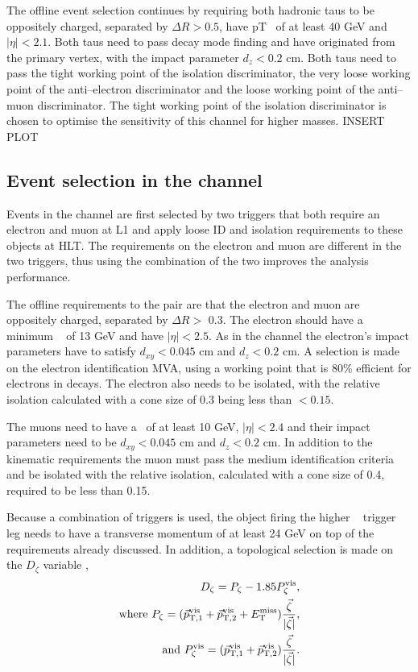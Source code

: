 The offline event selection continues by requiring both hadronic taus to be oppositely charged, separated
by $\Delta R > 0.5$, have pT~ of at least 40 GeV and $|\eta|<2.1$. Both taus need
to pass decay mode finding and have originated from the primary vertex, with the impact parameter $d_{z} < 0.2$ cm. 
Both taus need to pass the tight working point of the isolation discriminator, the very loose 
working point of the anti--electron discriminator and the loose working point of the anti--muon discriminator. 
The tight working point of the isolation discriminator is chosen to optimise the sensitivity
of this channel for higher masses. INSERT PLOT

\subsection{\texorpdfstring{Event selection in the \emu channel}{Event selection in the e mu channel}}
\label{sec:mssm_eventsel_em}
Events in the \emu channel are first selected by two triggers
that both require an electron and muon at \ac{L1} and apply loose ID and
isolation requirements to these objects at \ac{HLT}. The \pT requirements on
the electron and muon are different in the two triggers, thus using the combination of the two
improves the analysis performance.

The offline requirements to the \emu pair are that the electron 
and muon are oppositely charged, separated by $\Delta R >$ 0.3. The 
electron should have a minimum \pT~ of 13 GeV and have $|\eta|< 2.5$. As
in the \etau channel the electron's impact parameters have to 
satisfy $d_{xy} < 0.045$ cm and $d_{z}<0.2$ cm. A selection is
made on the electron identification MVA, using a working point that 
is 80\% efficient for electrons in \Zee decays. The electron
also needs to be isolated, with the relative isolation calculated
with a cone size of 0.3 being less than $<0.15$.

The muons need to have a \pT~of at least 10 GeV, $|\eta|<2.4$ and 
their impact parameters need to be $d_{xy}<0.045$ cm and $d_{z}<0.2$ cm.
In addition to the kinematic requirements the muon must
pass the medium identification criteria and be isolated with the relative
isolation, calculated with a cone size of 0.4, required to be less than 0.15.

Because a combination of triggers is used, the object firing
the higher \pT~ trigger leg needs to have a transverse momentum
of at least 24 GeV on top of the requirements already discussed.
In addition, a topological selection is made on the $D_{\zeta}$ variable \cite{cdf-dzeta},
\begin{align}\label{eqn:mssm_em_dzeta}
D_{\zeta} = P_{\zeta} - 1.85 P_{\zeta}^{\text{vis}}, \notag \\
\text{where } P_{\zeta} = (\vec{p}_{\text{T},1}^{\text{vis}} + \vec{p}_{\text{T},2}^{\text{vis}} + E_{\text{T}}^{\text{miss}})\frac{\vec{\zeta}}{|\vec{\zeta}|}, \notag \\
\text{and } P_{\zeta}^{\text{vis}} = (\vec{p}_{\text{T},1}^{\text{vis}}+\vec{p}_{\text{T},2}^{\text{vis}})\frac{\vec{\zeta}}{|\vec{\zeta}|}.
\end{align}

